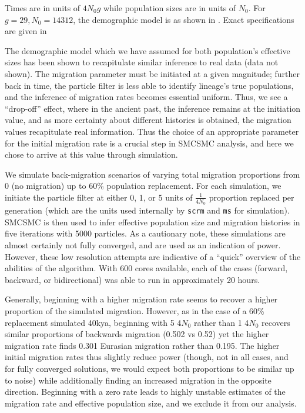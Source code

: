 Times are in units of $4N_0g$ while population sizes are in units of $N_0$. For $g=29, N_0 = 14312$, the demographic model is as shown in .  Exact specifications are given in 

The demographic model which we have assumed for both population's effective sizes has been shown to recapitulate similar inference to real data (data not shown). The migration parameter must be initiated at a given magnitude; further back in time, the particle filter is less able to identify lineage's true populations, and the inference of migration rates becomes essential uniform. Thus, we see a ``drop-off'' effect, where in the ancient past, the inference remains at the initiation value, and as more certainty about different histories is obtained, the migration values recapitulate real information. Thus the choice of an appropriate parameter for the initial migration rate is a crucial step in SMCSMC analysis, and here we chose to arrive at this value through simulation.

We simulate back-migration scenarios of varying total migration proportions from 0 (no migration) up to 60\% population replacement. For each simulation, we initiate the particle filter at either 0, 1, or 5 units of $\frac{1}{4 N_0}$ proportion replaced per generation (which are the units used internally by {\tt scrm} and {\tt ms} for simulation).  SMCSMC is then used to infer effective population size and migration histories in five iterations with 5000 particles. As a cautionary note, these simulations are almost certainly not fully converged, and are used as an indication of power. However, these low resolution attempts are indicative of a ``quick'' overview of the abilities of the algorithm. With 600 cores available, each of the cases (forward, backward, or bidirectional) was able to run in approximately 20 hours. 

Generally, beginning with a higher migration rate seems to recover a higher proportion of the simulated migration. However, as in the case of a 60\% replacement simulated 40kya, beginning with 5 4$N_0$ rather than 1 4$N_0$ recovers similar proportions of backwards migration (0.502 vs 0.52) yet the higher migration rate finds 0.301 Eurasian migration rather than 0.195. The higher initial migration rates thus slightly reduce power (though, not in all cases, and for fully converged solutions, we would expect both proportions to be similar up to noise) while additionally finding an increased migration in the opposite direction.  Beginning with a zero rate leads to highly unstable estimates of the migration rate and effective population size, and we exclude it from our analysis.




